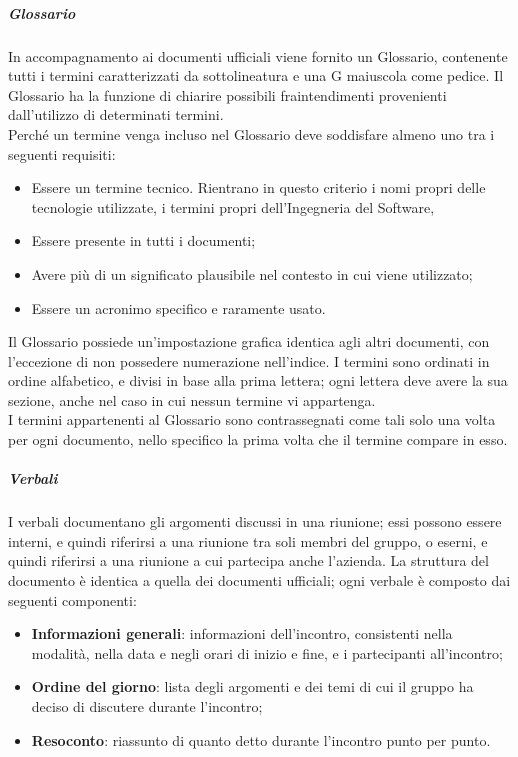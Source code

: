 \documentclass[../norme-di-progetto.tex]{subfiles}
\begin{document}
\subparagraph{Glossario}
In accompagnamento ai documenti ufficiali viene fornito un Glossario, contenente tutti i termini caratterizzati da sottolineatura e una G maiuscola come pedice. Il Glossario ha la funzione di chiarire possibili fraintendimenti provenienti dall'utilizzo di determinati termini. \\
Perché un termine venga incluso nel Glossario deve soddisfare almeno uno tra i seguenti requisiti:
\begin{itemize}
  \item Essere un termine tecnico. Rientrano in questo criterio i nomi propri delle tecnologie utilizzate, i termini propri dell'Ingegneria del Software,
  \item Essere presente in tutti i documenti;
  \item Avere più di un significato plausibile nel contesto in cui viene utilizzato;
  \item Essere un acronimo specifico e raramente usato.
\end{itemize}
Il Glossario possiede un'impostazione grafica identica agli altri documenti, con l'eccezione di non possedere numerazione nell'indice. I termini sono ordinati in ordine alfabetico, e divisi in base alla prima lettera; ogni lettera deve avere la sua sezione, anche nel caso in cui nessun termine vi appartenga. \\
I termini appartenenti al Glossario sono contrassegnati come tali solo una volta per ogni documento, nello specifico la prima volta che il termine compare in esso.

\subparagraph{Verbali}
I verbali documentano gli argomenti discussi in una riunione; essi possono essere interni, e quindi riferirsi a una riunione tra soli membri del gruppo, o eserni, e quindi riferirsi a una riunione a cui partecipa anche l'azienda. La struttura del documento è identica a quella dei documenti ufficiali; ogni verbale è composto dai seguenti componenti:
\begin{itemize}
  \item \textbf{Informazioni generali}: informazioni dell'incontro, consistenti nella modalità, nella data e negli orari di inizio e fine, e i partecipanti all'incontro;
  \item \textbf{Ordine del giorno}: lista degli argomenti e dei temi di cui il gruppo ha deciso di discutere durante l'incontro;
  \item \textbf{Resoconto}: riassunto di quanto detto durante l'incontro punto per punto.
\end{itemize}
\end{document}
